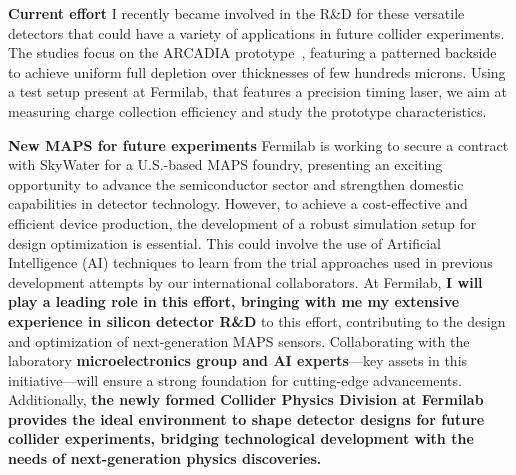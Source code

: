 {\begin{flushleft}
\textbf{Current effort}
I recently became involved in the R\&D for these versatile detectors that could have a variety of applications in future collider experiments. The studies focus on the ARCADIA prototype~\cite{[7]}, featuring a patterned backside to achieve uniform full depletion over thicknesses of few hundreds microns. Using a test setup present at Fermilab, that features a precision timing laser, we aim at measuring charge collection efficiency and study the prototype characteristics.

\textbf{New MAPS for future experiments}
Fermilab is working to secure a contract with SkyWater for a U.S.-based MAPS foundry, presenting an exciting opportunity to advance the semiconductor sector and strengthen domestic capabilities in detector technology. However, to achieve a cost-effective and efficient device production, the development of a robust simulation setup for design optimization is essential. This could involve the use of Artificial Intelligence (AI) techniques to learn from the trial approaches used in previous development attempts by our international collaborators. %
At Fermilab, {\bf I will play a leading role in this effort, bringing with me my extensive experience in silicon detector R\&D} to this effort, contributing to the design and optimization of next-generation MAPS sensors. Collaborating with the laboratory {\bf microelectronics group and AI experts}—key assets in this initiative—will ensure a strong foundation for cutting-edge advancements. Additionally, \textbf{the newly formed Collider Physics Division at Fermilab provides the ideal environment to shape detector designs for future collider experiments, bridging technological development with the needs of next-generation physics discoveries.}


 



\end{flushleft}}
